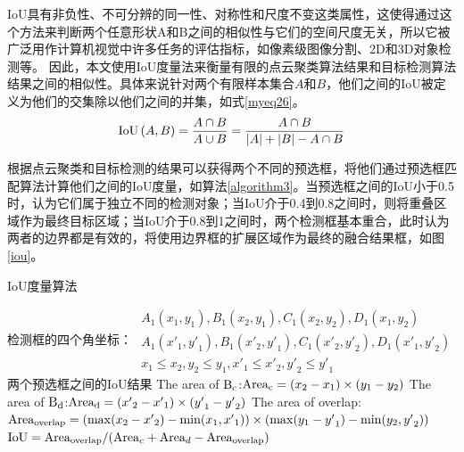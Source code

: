 IoU具有非负性、不可分辨的同一性、对称性和尺度不变这类属性，这使得通过这个方法来判断两个任意形状A和B之间的相似性与它们的空间尺度无关，所以它被广泛用作计算机视觉中许多任务的评估指标，如像素级图像分割、2D和3D对象检测等。
因此，本文使用IoU度量法来衡量有限的点云聚类算法结果和目标检测算法结果之间的相似性。具体来说针对两个有限样本集合$A$和$B$，他们之间的IoU被定义为他们的交集除以他们之间的并集，如式\ref{myeq26}。
\begin{equation}
    {\rm{IoU}}\left( {A,B} \right) = \frac{{A \cap B}}{{A \cup B}} = \frac{{A \cap B}}{{\left| A \right| + \left| B \right| - A \cap B}}
    \label{myeq26}
\end{equation}

根据点云聚类和目标检测的结果可以获得两个不同的预选框，将他们通过预选框匹配算法计算他们之间的IoU度量，如算法\ref{algorithm3}。当预选框之间的IoU小于0.5时，认为它们属于独立不同的检测对象；当IoU介于0.4到0.8之间时，则将重叠区域作为最终目标区域；当IoU介于0.8到1之间时，两个检测框基本重合，此时认为两者的边界都是有效的，将使用边界框的扩展区域作为最终的融合结果框，如图\ref{iou}。
\begin{algorithm}[!h]
    \caption{IoU度量算法}
    \label{algorithm3}
    \renewcommand{\algorithmicrequire}{\textbf{Input:}}
    \renewcommand{\algorithmicensure}{\textbf{Output:}}
    \renewcommand{\algorithmiccomment}[1]{\hfill $\triangleright$ #1}
    \begin{algorithmic}[1]
        \REQUIRE 检测框的四个角坐标：
        $\begin{array}{l}
            {A_1}\left( {{x_1},{y_1}} \right),{B_1}\left( {{x_2},{y_1}} \right),{C_1}\left( {{x_2},{y_2}} \right),{D_1}\left( {{x_1},{y_2}} \right)\\
            {A_1}\left( {{{x'}_1},{{y'}_1}} \right),{B_1}\left( {{{x'}_2},{{y'}_1}} \right),{C_1}\left( {{{x'}_2},{{y'}_2}} \right),{D_1}\left( {{{x'}_1},{{y'}_2}} \right)\\
            {x_1} \le {x_2},{y_2} \le {y_1},{{x'}_1} \le {{x'}_2},{{y'}_2} \le {{y'}_1}
            \end{array}$  %
        \ENSURE 两个预选框之间的IoU结果   %
        \STATE  The area of ${{\rm{B}}_{{\rm{c }}}}$:${\rm{Are}}{{\rm{a}}_{\rm{c}}} = ({x_2} - {x_1}) \times ({y_1} - {y_2})$
        \STATE  The area of ${{\rm{B}}_{{\rm{d }}}}$:${\rm{Are}}{{\rm{a}}_{\rm{d}}} = ({{x'}_2} - {{x'}_1}) \times ({{y'}_1} - {{y'}_2})$
		\STATE  The area of overlap:\\
        ${\rm{Are}}{{\rm{a}}_{{\rm{overlap}}}} = (\max ({x_2} - {{x'}_2}) - \min ({x_1},{{x'}_1})) \times (\max ({y_1} - {{y'}_1}) - \min ({y_2},{{y'}_2}))$
		\STATE  ${\rm{IoU}} = {\rm{Are}}{{\rm{a}}_{{\rm{overlap}}}}/({\rm{Are}}{{\rm{a}}_c} + {\rm{Are}}{{\rm{a}}_d} - {\rm{Are}}{{\rm{a}}_{{\rm{overlap}}}})$
    \end{algorithmic}
\end{algorithm}
